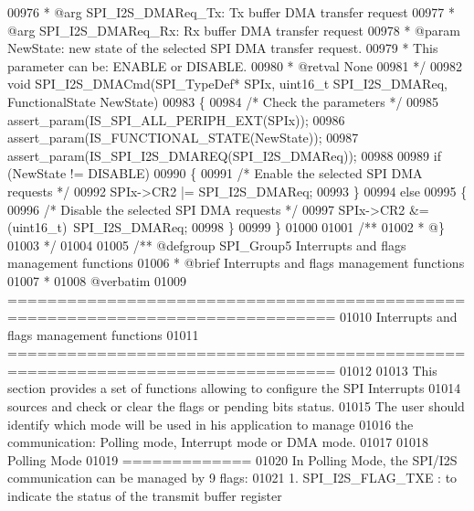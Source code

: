 \begin{DoxyCode}
00976 \textcolor{comment}{  *            @arg SPI\_I2S\_DMAReq\_Tx: Tx buffer DMA transfer request}
00977 \textcolor{comment}{  *            @arg SPI\_I2S\_DMAReq\_Rx: Rx buffer DMA transfer request}
00978 \textcolor{comment}{  * @param  NewState: new state of the selected SPI DMA transfer request.}
00979 \textcolor{comment}{  *          This parameter can be: ENABLE or DISABLE.}
00980 \textcolor{comment}{  * @retval None}
00981 \textcolor{comment}{  */}
00982 \textcolor{keywordtype}{void} SPI_I2S_DMACmd(SPI\_TypeDef* SPIx, uint16\_t SPI\_I2S\_DMAReq, FunctionalState NewState)
00983 \{
00984   \textcolor{comment}{/* Check the parameters */}
00985   assert_param(IS\_SPI\_ALL\_PERIPH\_EXT(SPIx));
00986   assert_param(IS\_FUNCTIONAL\_STATE(NewState));
00987   assert_param(IS\_SPI\_I2S\_DMAREQ(SPI\_I2S\_DMAReq));
00988 
00989   \textcolor{keywordflow}{if} (NewState != DISABLE)
00990   \{
00991     \textcolor{comment}{/* Enable the selected SPI DMA requests */}
00992     SPIx->CR2 |= SPI\_I2S\_DMAReq;
00993   \}
00994   \textcolor{keywordflow}{else}
00995   \{
00996     \textcolor{comment}{/* Disable the selected SPI DMA requests */}
00997     SPIx->CR2 &= (uint16\_t)~SPI\_I2S\_DMAReq;
00998   \}
00999 \}
01000 
01001 \textcolor{comment}{/**}
01002 \textcolor{comment}{  * @\}}
01003 \textcolor{comment}{  */}
01004 
01005 \textcolor{comment}{/** @defgroup SPI\_Group5 Interrupts and flags management functions}
01006 \textcolor{comment}{ *  @brief   Interrupts and flags management functions}
01007 \textcolor{comment}{  *}
01008 \textcolor{comment}{@verbatim   }
01009 \textcolor{comment}{ ===============================================================================}
01010 \textcolor{comment}{                         Interrupts and flags management functions}
01011 \textcolor{comment}{ ===============================================================================  }
01012 \textcolor{comment}{}
01013 \textcolor{comment}{  This section provides a set of functions allowing to configure the SPI Interrupts }
01014 \textcolor{comment}{  sources and check or clear the flags or pending bits status.}
01015 \textcolor{comment}{  The user should identify which mode will be used in his application to manage }
01016 \textcolor{comment}{  the communication: Polling mode, Interrupt mode or DMA mode. }
01017 \textcolor{comment}{    }
01018 \textcolor{comment}{  Polling Mode}
01019 \textcolor{comment}{  =============}
01020 \textcolor{comment}{  In Polling Mode, the SPI/I2S communication can be managed by 9 flags:}
01021 \textcolor{comment}{     1. SPI\_I2S\_FLAG\_TXE : to indicate the status of the transmit buffer register}

\end{DoxyCode}
